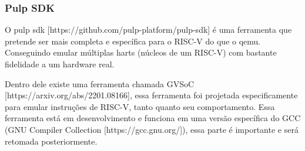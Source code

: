 \subsubsection{Pulp SDK}

O pulp sdk [https://github.com/pulp-platform/pulp-sdk] é uma ferramenta que pretende ser mais completa e específica para o RISC-V do que o qemu. 
Conseguindo emular múltiplas harts (núcleos de um RISC-V) com bastante fidelidade a um hardware real.

Dentro dele existe uma ferramenta chamada GVSoC [https://arxiv.org/abs/2201.08166], essa ferramenta foi projetada especificamente para emular 
instruções de RISC-V, tanto quanto seu comportamento. Essa ferramenta está em desenvolvimento e funciona em uma versão específica do 
GCC (GNU Compiler Collection [https://gcc.gnu.org/]), essa parte é importante e será retomada posteriormente.
